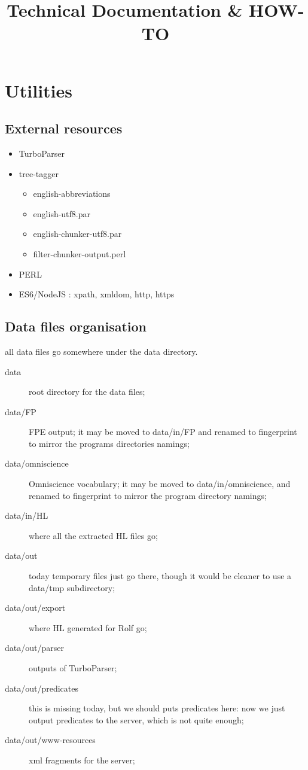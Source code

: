\documentclass[a4paper,11pt]{report}
\title{Technical Documentation \& HOW-TO}
\begin{document}
\maketitle
\tableofcontents
\chapter{Utilities}
\section{External resources}
\begin{itemize}
\item TurboParser
\item tree-tagger
  \begin{itemize}
  \item english-abbreviations
  \item english-utf8.par
  \item english-chunker-utf8.par
  \item filter-chunker-output.perl
  \end{itemize}
\item PERL
\item ES6/NodeJS : xpath, xmldom, http, https
\end{itemize}
\section{Data files organisation}
all data files go somewhere under the data directory.
\begin{description}
\item[data] root directory for the data files;
\item[data/FP] FPE output; it may be moved to data/in/FP and renamed to fingerprint to mirror the programs directories namings;
\item[data/omniscience] Omniscience vocabulary; it may be moved to data/in/omniscience, and renamed to fingerprint to mirror the program directory namings;
\item[data/in/HL] where all the extracted HL files go;
\item[data/out] today temporary files just go there, though it would be cleaner to use a data/tmp subdirectory;
\item[data/out/export] where HL generated for Rolf go;
\item[data/out/parser] outputs of TurboParser;
\item[data/out/predicates] this is missing today, but we should puts predicates here: now we just output predicates to the server, which is not quite enough;
  \item[data/out/www-resources] xml fragments for the server;
\end{description}
\end{document}
